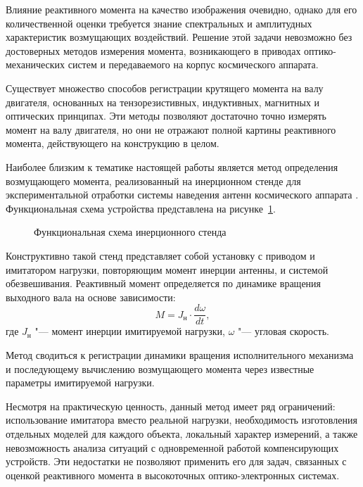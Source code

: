 Влияние реактивного момента на качество изображения очевидно, однако для его количественной оценки требуется знание спектральных и амплитудных характеристик возмущающих воздействий. Решение этой задачи невозможно без достоверных методов измерения момента, возникающего в приводах оптико-механических систем и передаваемого на корпус космического аппарата.

Существует множество способов регистрации крутящего момента на валу двигателя, основанных на тензорезистивных, индуктивных, магнитных и оптических принципах. Эти методы позволяют достаточно точно измерять момент на валу двигателя, но они не отражают полной картины реактивного момента, действующего на конструкцию в целом.

Наиболее близким к тематике настоящей работы является метод определения возмущающего момента, реализованный на инерционном стенде для экспериментальной отработки системы наведения антенн космического аппарата \cite{Goncharuk2013}. Функциональная схема устройства представлена на рисунке~\cref{fig:stand}.

\begin{figure}[h!] 
	\caption{Функциональная схема инерционного стенда}
	\label{fig:stand} 
\end{figure}
Конструктивно такой стенд представляет собой установку с приводом и имитатором нагрузки, повторяющим момент инерции антенны, и системой обезвешивания. Реактивный момент определяется по динамике вращения выходного вала на основе зависимости:
\begin{equation*}
	\label{eq:eq_M_disturb}
	M=J_{\text{н}}\cdot \frac{d\omega}{dt},
\end{equation*}
\noindent где \(J_{\text{н}}\) "--- момент инерции имитируемой нагрузки, \(\omega\) "--- угловая скорость.

Метод сводиться к регистрации динамики вращения исполнительного механизма и последующему вычислению возмущающего момента через известные параметры имитируемой нагрузки.

Несмотря на практическую ценность, данный метод имеет ряд ограничений: использование имитатора вместо реальной нагрузки, необходимость изготовления отдельных моделей для каждого объекта, локальный характер измерений, а также невозможность анализа ситуаций с одновременной работой компенсирующих устройств. Эти недостатки не позволяют применить его для задач, связанных с оценкой реактивного момента в высокоточных оптико-электронных системах.

